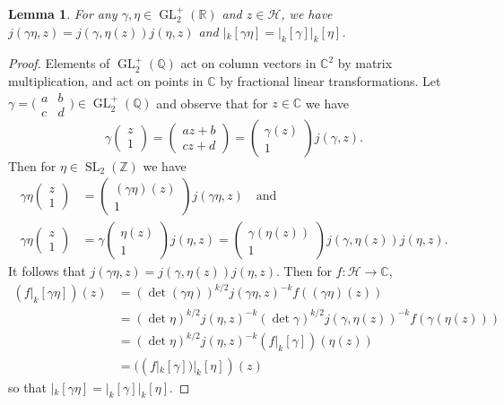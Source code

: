 \documentclass[10pt,leqno,twoside]{article}
\theoremstyle{plain}
\newtheorem{lemma}[lem]{Lemma}
\theoremstyle{definition}
\numberwithin{equation}{section}
\numberwithin{lem}{section}
\DeclareMathOperator{\GL}{GL}
\DeclareMathOperator{\SL}{SL}
\newcommand{\smallabcd}{\big(\!\begin{smallmatrix}
    a & b \\ c & d
\end{smallmatrix}\!\big)}
\newcommand{\slz}{\SL_2(\mathbb{Z})}
\newcommand{\glrp}{\GL_2^+(\mathbb{R})}
\newcommand{\glqp}{\GL_2^+(\mathbb{Q})}
\begin{document}
\begin{lemma}\label{lem: props of automorphy}
    For any $\gamma,\eta\in \glrp$ and $z\in \mathcal H$, we have $j(\gamma\eta,z) = j(\gamma,\eta(z))j(\eta,z)$ and $|_k[\gamma\eta] = |_k[\gamma]|_k[\eta]$.
\end{lemma}
\begin{proof}
    Elements of $\glqp$ act on column vectors in $\mathbb C^2$ by matrix multiplication, and act on points in $\mathbb C$ by fractional linear transformations. Let $\gamma = \smallabcd\in \glqp$ and observe that for $z\in\mathbb C$ we have \[\gamma\begin{pmatrix}
        z \\ 1
    \end{pmatrix} = \begin{pmatrix}
        az+b \\ cz+d
    \end{pmatrix} = \begin{pmatrix}
        \gamma(z) \\ 1
    \end{pmatrix}j(\gamma,z).\]
    Then for $\eta\in\slz$ we have
    \begin{align*}
        \gamma\eta\begin{pmatrix}
            z \\ 1
        \end{pmatrix} &= \begin{pmatrix}
            (\gamma\eta)(z) \\ 1
        \end{pmatrix}j(\gamma\eta,z)\quad\text{and}\\
        \gamma\eta\begin{pmatrix}
            z \\ 1
        \end{pmatrix} &= \gamma\begin{pmatrix}
            \eta(z) \\ 1
        \end{pmatrix}j(\eta,z) = \begin{pmatrix}
            \gamma(\eta(z)) \\ 1
        \end{pmatrix}j(\gamma,\eta(z))j(\eta,z).
    \end{align*} 
    It follows that $j(\gamma\eta,z) = j(\gamma,\eta(z))j(\eta,z)$.
    Then for $f\colon \mathcal H\to \mathbb C$,
    \begin{align*}
        (f|_k[\gamma\eta])(z) &= (\det(\gamma\eta))^{k/2}j(\gamma\eta,z)^{-k}f((\gamma\eta)(z))\\
        &= (\det \eta)^{k/2}j(\eta,z)^{-k}(\det \gamma)^{k/2}j(\gamma,\eta(z))^{-k}f(\gamma(\eta(z)))\\
        &= (\det \eta)^{k/2}j(\eta,z)^{-k}(f|_k[\gamma])(\eta(z))\\
        &= ((f|_k[\gamma])|_k[\eta])(z)
    \end{align*} so that $|_k[\gamma\eta] = |_k[\gamma]|_k[\eta]$.
\end{proof}
\end{document}
